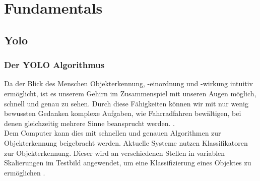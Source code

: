 \chapter{Fundamentals}
\label{ch:fundamentals}


\section{Yolo}

\subsection{Der YOLO Algorithmus \label{subsec:YOLO_Alg}} 
	{Da der Blick des Menschen Objekterkennung, -einordnung und -wirkung intuitiv ermöglicht, ist es unserem Gehirn im Zusammenspiel mit unseren Augen möglich, schnell und genau zu sehen. Durch diese Fähigkeiten können wir mit nur wenig bewussten Gedanken komplexe Aufgaben, wie Fahrradfahren bewältigen, bei denen gleichzeitig mehrere Sinne beansprucht werden. \citep{Redmon2016}. \\
	Dem Computer kann dies mit schnellen und genauen Algorithmen zur Objekterkennung beigebracht werden. Aktuelle Systeme nutzen Klassifikatoren zur Objekterkennung. Dieser wird an verschiedenen Stellen in variablen Skalierungen im Testbild angewendet, um eine Klassifizierung eines Objektes zu ermöglichen \citep{Redmon2016}. \\ 
	
}
